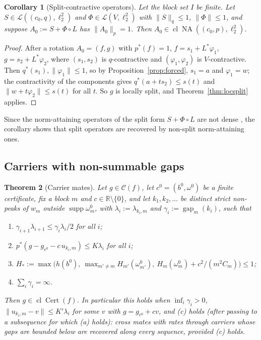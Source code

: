 \documentclass[10pt]{amsart}
\newtheorem{theorem}{Theorem}[section]
\newtheorem{corollary}[theorem]{Corollary}
\theoremstyle{definition}
\theoremstyle{remark}
\newcommand{\NA}{\operatorname{NA}}
\newcommand{\supp}{\operatorname{supp}}
\newcommand{\R}{\mathbb R}
\newcommand{\Cset}{\mathcal C}
\newcommand{\Cert}{\operatorname{Cert}}
\newcommand{\cl}{\operatorname{cl}}
\newcommand{\gap}{\operatorname{gap}}
\begin{document}
\begin{corollary}[Split-contractive operators]\label{cor:splitcontractive}
Let the block set $I$ be finite.  Let $S\in\mathcal L((c_0,q),\ell_2^2)$
and $\Phi\in\mathcal L(V,\ell_2^2)$ with $\|S\|_q\le1$, $\|\Phi\|\le1$, and
suppose $A_0:=S+\Phi\circ L$ has $\|A_0\|_p=1$.  Then
$A_0\in\cl\NA((c_0,p),\ell_2^2)$.
\end{corollary}

\begin{proof}
After a rotation $A_0=(f,g)$ with $p^*(f)=1$, $f=s_1+L^*\varphi_1$,
$g=s_2+L^*\varphi_2$, where $(s_1,s_2)$ is $q$-contractive and
$(\varphi_1,\varphi_2)$ is $V$-contractive.  Then $q^*(s_1),\|\varphi_1\|\le
1$, so by Proposition~\ref{prop:forced}, $s_1=a$ and $\varphi_1=w$; the
contractivity of the components gives $q^*(a+ts_2)\le s(t)$ and
$\|w+t\varphi_2\|\le s(t)$ for all $t$.  So $g$ is locally split, and
Theorem~\ref{thm:locsplit} applies.
\end{proof}

Since the norm-attaining operators of the split form $S+\Phi\circ L$ are
not dense \cite[Section~3]{PrA}, the corollary shows that split operators
are recovered by non-split norm-attaining ones.

\subsection{Carriers with non-summable gaps}

\begin{theorem}[Carrier mates]\label{thm:carriers}
Let $g\in\Cset(f)$, let $c^0=(b^0,\omega^0)$ be a finite certificate, fix a
block $m$ and $c\in\R\setminus\{0\}$, and let $k_1,k_2,\dots$ be distinct
strict non-peaks of $w_m$ outside $\supp\omega^0_m$, with
$\lambda_i:=\lambda_{k_i,m}$ and $\gamma_i:=\gap_m(k_i)$, such that
\begin{enumerate}
\item[(a)] $\gamma_{i+1}\lambda_{i+1}\le\gamma_i\lambda_i/2$ for all $i$;
\item[(b)] $p^*(g-g_{c^0}-c\,u_{k_i,m})\le K\lambda_i$ for all $i$;
\item[(c)] $H_*:=\max\big(h(b^0),\ \max_{m'\ne m}H_{m'}(\omega^0_{m'}),\
H_m(\omega^0_m)+c^2/(m^2C_m)\big)\le1$;
\item[(d)] $\sum_i\gamma_i=\infty$.
\end{enumerate}
Then $g\in\cl\Cert(f)$.  In particular this holds when $\inf_i\gamma_i>0$,
$\|u_{k_i,m}-v\|\le K'\lambda_i$ for some $v$ with $g=g_{c^0}+cv$, and
\textup{(c)} holds \textup{(}after passing to a subsequence for which
\textup{(a)} holds\textup{)}: cross mates with rates through carriers whose
gaps are bounded below are recovered along every sequence, provided
\textup{(c)} holds.
\end{theorem}
\end{document}
